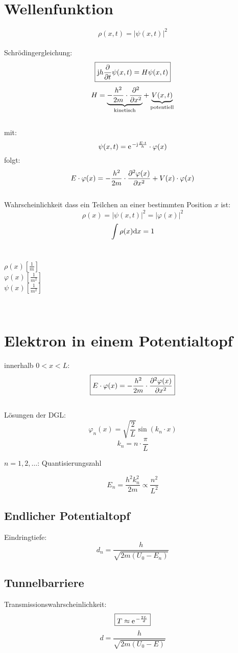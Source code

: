 \section{Wellenfunktion}
\[\boxed{
	\rho(x,t) = \left| \psi(x,t) \right|^2 
}\]
\\
Schrödingergleichung:
\[\boxed{
	\mathrm{j} h \frac{\partial }{\partial t} \psi(x,t) = H \psi(x,t)
}\]
\[
	H = \underbrace{- \frac{h^2}{2m} \cdot \frac{\partial ^2}{\partial x^2}}_{\text{kinetisch}} + \underbrace{V(x,t)}_{\text{potentiell}}
\]
\\
mit:
\[
	\psi(x,t) = \mathrm{e\;\!}^{-\mathrm{j} \frac{E \cdot t}{h}} \cdot \varphi(x)
\]
folgt:
\[
	E \cdot \varphi(x) = - \frac{h^2}{2m} \cdot \frac{\partial ^2 \varphi(x)}{\partial x^2} + V(x) \cdot \varphi(x)
\]
\\
Wahrscheinlichkeit dass ein Teilchen an einer bestimmten Position $x$ ist:
\[\boxed{
	\rho(x) = \left| \psi(x,t) \right|^2 = \left| \varphi(x) \right|^2
}\]
\[
	\int \rho(x) \mathrm{d} x = 1
\]
\\
\begin{footnotesize}
	$\rho(x) \left[ \frac{1}{m} \right]$\\
	$\varphi(x) \left[ \frac{1}{m^2} \right]$\\
	$\psi(x) \left[ \frac{1}{m^2} \right]$
\end{footnotesize}
\\

\section{Elektron in einem Potentialtopf}
innerhalb $0 < x < L$:
\[\boxed{
	E \cdot \varphi(x) = - \frac{h^2}{2m} \cdot \frac{\partial ^2 \varphi(x)}{\partial x^2}
}\]
\\
Lösungen der DGL:
\[\boxed{
	\varphi_n(x) = \sqrt{\frac{2}{L}} \sin(k_n \cdot x)
}\]
\[\boxed{
	k_n = n \cdot \frac{\pi}{L}
}\]
\begin{footnotesize}
	$n = 1,2,\dots$: Quantisierungszahl
\end{footnotesize}
\[\boxed{
	E_n = \frac{h^2 k_n^2}{2m} \propto \frac{n^2}{L^2}
}\]

\subsection{Endlicher Potentialtopf}
Eindringtiefe:
\[\boxed{
	d_n = \frac{h}{\sqrt{2m(U_0 - E_n)}}
}\]

\subsection{Tunnelbarriere}
Transmissionswahrscheinlichkeit:
\[\boxed{
	T \approx \mathrm{e\;\!}^{-\frac{2L}{d}}
}\]
\[\boxed{
	d = \frac{h}{\sqrt{2m(U_0-E)}}
}\]